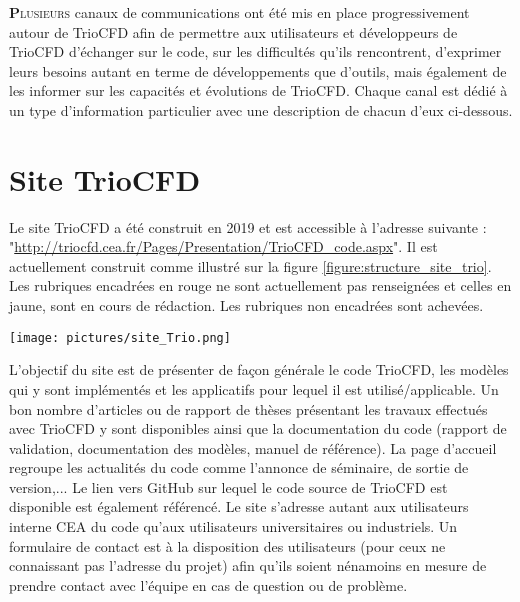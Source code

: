 
\lettrine[lines=2,slope=0pt,nindent=4pt]{\textbf{P}}{lusieurs} canaux de communications ont été mis en place progressivement autour de TrioCFD
afin de permettre aux utilisateurs et développeurs de TrioCFD d'échanger sur le code, sur les difficultés qu'ils rencontrent, d'exprimer
leurs besoins autant en terme de développements que d'outils, mais également de les informer sur les capacités et évolutions de
TrioCFD. Chaque canal est dédié à un type d'information particulier avec une description de chacun d'eux ci-dessous.

\chapter{\label{chapitre:site}Site TrioCFD}

Le site TrioCFD a été construit en 2019 et est accessible à l'adresse suivante :
"\url{http://triocfd.cea.fr/Pages/Presentation/TrioCFD_code.aspx}". Il est actuellement construit comme illustré sur
la figure \ref{figure:structure_site_trio}. Les rubriques encadrées en rouge ne sont actuellement pas renseignées
et celles en jaune, sont en cours de rédaction. Les rubriques non encadrées sont achevées.\newline

\begin{center}\texttt{[image: pictures/site\_Trio.png]}\end{center}
\begin{center}\end{center}

L'objectif du site est de présenter de fa\c con générale le code TrioCFD, les modèles qui y sont implémentés et les applicatifs pour lequel il est utilisé/applicable. Un bon nombre d'articles ou de rapport de thèses présentant les travaux effectués avec TrioCFD y sont disponibles ainsi que la documentation du code (rapport de validation, documentation des modèles, manuel de référence). La page d'accueil regroupe les actualités du code comme l'annonce de séminaire, de sortie de version,... Le lien vers GitHub sur lequel le code source de TrioCFD est disponible est également référencé.\newline
Le site s'adresse autant aux utilisateurs interne CEA du code qu'aux utilisateurs universitaires ou industriels. Un formulaire de contact est à la disposition des utilisateurs (pour ceux ne connaissant pas l'adresse du projet) afin qu'ils soient nénamoins en mesure de prendre contact avec l'équipe en cas de question ou de problème.

